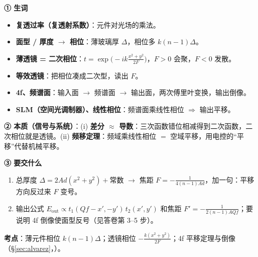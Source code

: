 \label{rd:v-alvarez}
\begin{idea}[读题：概念与要交什么]
\textbf{① 生词}
\begin{itemize}
\item \textbf{复透过率（复透射系数）}：元件对光场的乘法。
\item \textbf{面型 / 厚度 $\to$ 相位}：薄玻璃厚 $\Delta$，相位多 $k(n-1)\Delta$。
\item \textbf{薄透镜 = 二次相位}：$t=\exp\!\big(-ik\frac{x^2+y^2}{2F}\big)$，$F>0$ 会聚，$F<0$ 发散。
\item \textbf{等效透镜}：把相位凑成二次型，读出 $F$。
\item \textbf{4f、频谱面}：输入面 $\to$ 频谱面 $\to$ 输出面，两次傅里叶变换，输出倒像。
\item \textbf{SLM（空间光调制器）、线性相位}：频谱面乘线性相位 $\Rightarrow$ 输出平移。
\end{itemize}
\textbf{② 本质（信号与系统）}：(i) \textbf{差分 $\approx$ 导数}：三次函数错位相减得到二次函数，二次相位就是透镜。(ii) \textbf{频移定理}：频域乘线性相位 $=$ 空域平移，用电控的“平移”代替机械平移。

\textbf{③ 要交什么}
\begin{enumerate}[label=\roman*.]
\item 总厚度 $\Delta=2Ad(x^2+y^2)+$常数 $\to$ 焦距 $F=-\frac{1}{4(n-1)Ad}$，加一句：平移方向反过来 $F$ 变号。
\item 输出公式 $E_{\text{out}}\propto t_1(Qf-x',-y')\,t_2(x',y')$ 和焦距 $F'=-\frac{1}{2(n-1)AQf}$；要说明 4f 倒像使面型反号（见答卷第 3–5 步）。
\end{enumerate}
\end{idea}


\textbf{考点}：薄元件相位 $k(n-1)\Delta$；透镜相位 $-\frac{k(x^2+y^2)}{2F}$；4f 平移定理与倒像（§\ref{sec:alvarez}，\pageref{sec:alvarez}）。

